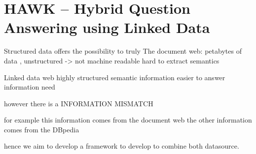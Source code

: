 %

\chapter{HAWK -- Hybrid Question Answering using Linked Data}



Structured data offers the possibility to truly 
The 
document web:
petabytes of data , unstructured -> not machine readable
hard to extract semantics

Linked data web
highly structured
semantic information
easier to answer information need

however there is a INFORMATION MISMATCH 

for example this information comes from the document web
the other information comes from the DBpedia

hence we aim to develop a framework to develop to combine both datasource.






